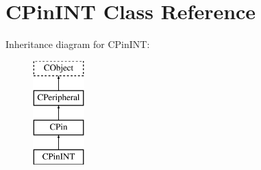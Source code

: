 \hypertarget{class_c_pin_i_n_t}{\section{C\-Pin\-I\-N\-T Class Reference}
\label{class_c_pin_i_n_t}
}
Inheritance diagram for C\-Pin\-I\-N\-T\-:\begin{figure}[H]
\begin{center}
\leavevmode
\includegraphics[height=4.000000cm]{class_c_pin_i_n_t}
\end{center}
\end{figure}
